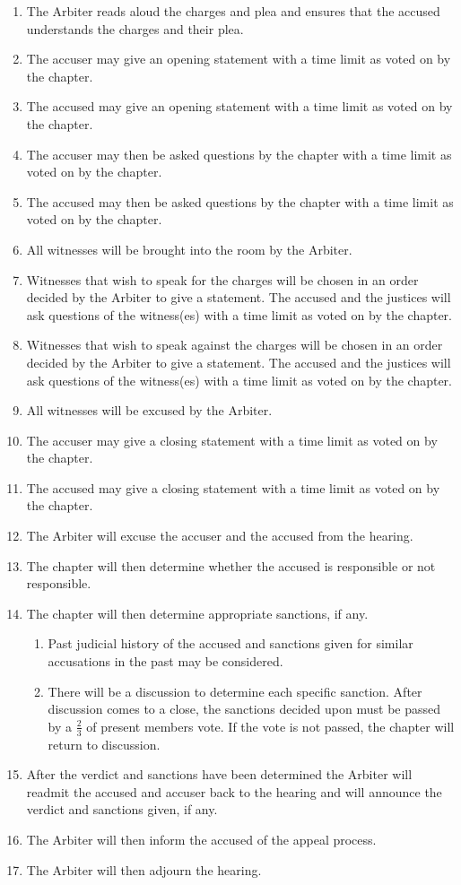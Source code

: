 	\begin{enumerate}
		\item The Arbiter reads aloud the charges and plea and ensures that the accused understands the charges and their plea.
		\item The accuser may give an opening statement with a time limit as voted on by the chapter.
		\item The accused may give an opening statement with a time limit as voted on by the chapter.
		\item The accuser may then be asked questions by the chapter with a time limit as voted on by the chapter.
		\item The accused may then be asked questions by the chapter with a time limit as voted on by the chapter.
		\item All witnesses will be brought into the room by the Arbiter.
		\item Witnesses that wish to speak for the charges will be chosen in an order decided by the Arbiter to give a statement. The accused and the justices will ask questions of the witness(es) with a time limit as voted on by the chapter.
		\item Witnesses that wish to speak against the charges will be chosen in an order decided by the Arbiter to give a statement. The accused and the justices will ask questions of the witness(es) with a time limit as voted on by the chapter.
		\item All witnesses will be excused by the Arbiter.
		\item The accuser may give a closing statement with a time limit as voted on by the chapter.
		\item The accused may give a closing statement with a time limit as voted on by the chapter.
		\item The Arbiter will excuse the accuser and the accused from the hearing.
		\item The chapter will then determine whether the accused is responsible or not responsible.
		\item The chapter will then determine appropriate sanctions, if any.
			\begin{enumerate}
				\item Past judicial history of the accused and sanctions given for similar accusations in the past may be considered.
				\item There will be a discussion to determine each specific sanction. After discussion comes to a close, the sanctions decided upon must be passed by a $\frac{2}{3}$ of present members vote. If the vote is not passed, the chapter will return to discussion.
			\end{enumerate}
		\item After the verdict and sanctions have been determined the Arbiter will readmit the accused and accuser back to the hearing and will announce the verdict and sanctions given, if any.
		\item The Arbiter will then inform the accused of the appeal process.
		\item The Arbiter will then adjourn the hearing.
	\end{enumerate}	

